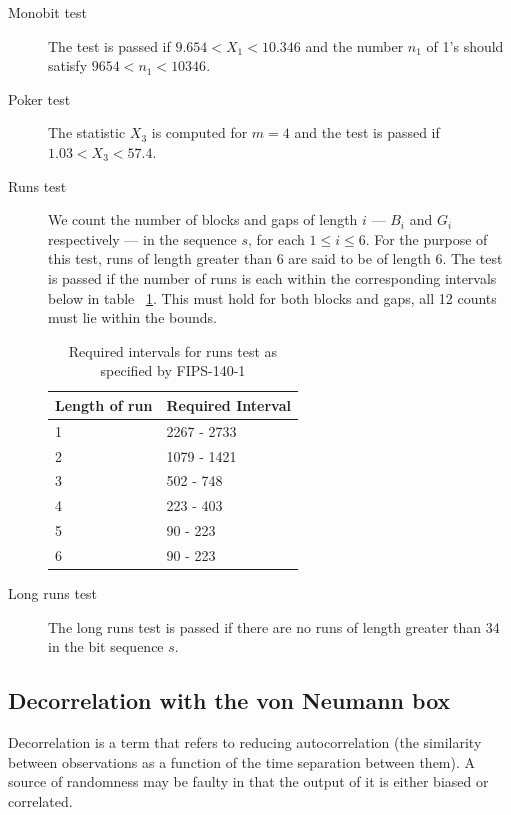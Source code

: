 \documentclass[a4paper]{article}           %
\begin{document}
\begin{description}
\item[Monobit test] The test is passed if $9.654 < X_1 < 10.346$ and the number $n_1$ of 1's should satisfy $9654 < n_1 < 10346$.
\item[Poker test] The statistic $X_3$ is computed for $m=4$ and the test is passed if $1.03 < X_3 < 57.4$. 
\item [Runs test] We count the number of blocks and gaps of length $i$ --- $B_i$ and $G_i$ respectively --- in the sequence $s$, for each $1 \leq i \leq 6$. For the purpose of this test, runs of length greater than 6 are said to be of length 6\cite{fips140}. The test is passed if the number of runs is each within the corresponding intervals below in table ~\ref{tab:fipsbounds}. This must hold for both blocks and gaps, all 12 counts must lie within the bounds. 

  \begin{table}[H]
    \begin{center}
      \begin{tabular}{| l | l |}
        \hline
        Length of run & Required Interval \\
        \hline
        \hline
        1 & 2267 - 2733 \\
        2 & 1079 - 1421 \\
        3 & 502 - 748 \\
        4 & 223 - 403 \\
        5 & 90 - 223 \\
        6 & 90 - 223 \\
        \hline
      \end{tabular}
    \end{center}
    \caption{Required intervals for runs test as specified by FIPS-140-1}
    \label{tab:fipsbounds}
  \end{table}

\item[Long runs test] The long runs test is passed if there are no runs of length greater than 34 in the bit sequence $s$. 
\end{description}

\subsection{Decorrelation with the von Neumann box}

Decorrelation is a term that refers to reducing autocorrelation (the similarity between observations as a function of the time separation between them). A source of randomness may be faulty in that the output of it is either biased or correlated. 
\end{document}
